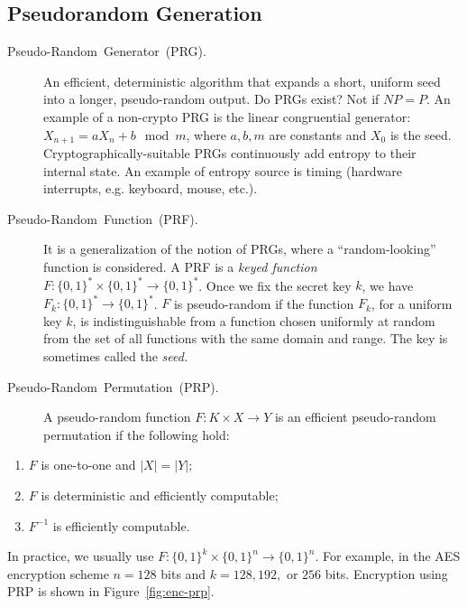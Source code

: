\documentclass[11pt]{article}
\theoremstyle{plain}
\begin{document}
\subsection{Pseudorandom Generation}
\begin{description}
	\item [{Pseudo-Random~Generator~(PRG).}] An efficient, deterministic
	algorithm that expands a short, uniform seed into a longer, pseudo-random
	output. Do PRGs exist? Not if $NP=P$. An example of a non-crypto
	PRG is the linear congruential generator: $X_{n+1}=aX_{n}+b\mod m$,
	where $a,b,m$ are constants and $X_{0}$ is the seed. Cryptographically-suitable
	PRGs continuously add entropy to their internal state. An example
	of entropy source is timing (hardware interrupts, e.g. keyboard, mouse,
	etc.).
	\item [{Pseudo-Random~Function~(PRF).}] It is a generalization of the
	notion of PRGs, where a \textquotedblleft random-looking\textquotedblright{}
	function is considered. A PRF is a \emph{keyed function} $F:\{0,1\}^{*}\times\{0,1\}^{*}\to\{0,1\}^{*}$.
	Once we fix the secret key $k$, we have $F_{k}:\{0,1\}^{*}\to\{0,1\}^{*}$.
	$F$ is pseudo-random if the function $F_{k}$, for a uniform key
	$k$, is indistinguishable from a function chosen uniformly at random
	from the set of all functions with the same domain and range. The
	key is sometimes called the \emph{seed.}
	\item [{Pseudo-Random~Permutation~(PRP).}] A pseudo-random function $F:K\times X\to Y$
	is an efficient pseudo-random permutation if the following hold:
\end{description}
\begin{enumerate}
	\item $F$ is one-to-one and $|X|=|Y|;$
	\item $F$ is deterministic and efficiently computable;
	\item $F^{-1}$ is efficiently computable.
\end{enumerate}
In practice, we usually use $F:\{0,1\}^{k}\times\{0,1\}^{n}\to\{0,1\}^{n}$.
For example, in the AES encryption scheme $n=128$ bits and $k=128,192,$
or $256$ bits. Encryption using PRP is shown in Figure~\ref{fig:enc-prp}.
\end{document}
